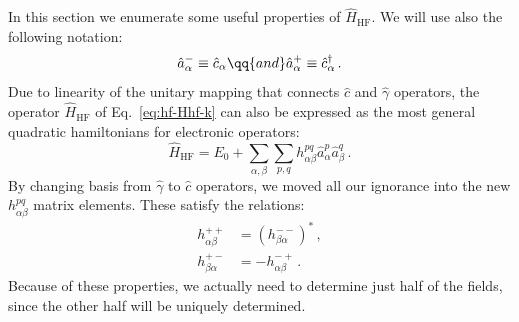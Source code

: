 In this section we enumerate some useful properties of $\hat H_\mathrm{HF}$. We will use also the following notation:
\[
	\hat a_\alpha^- \equiv \hat c_\alpha
	\qq{and}
	\hat a_\alpha^+ \equiv \hat c_\alpha^\dagger \, .
\]
Due to linearity of the unitary mapping that connects $\hat c$ and $\hat \gamma$ operators, the operator $\hat H_\mathrm{HF}$ of Eq.~\eqref{eq:hf-Hhf-k} can also be expressed as the most general quadratic hamiltonians for electronic operators:
\begin{equation}\label{eq:hf-Hhf-h}
	\hat H_\mathrm{HF} = E_0 + \sum_{\alpha,\beta} \sum_{p,q} h_{\alpha\beta}^{pq} \hat a_\alpha^p \hat a_\beta^q \, .
\end{equation}
By changing basis from $\hat \gamma$ to $\hat c$ operators, we moved all our ignorance into the new $h_{\alpha\beta}^{pq}$ matrix elements. These satisfy the relations:
\begin{align}
	h_{\alpha\beta}^{++} &= \left(h_{\beta\alpha}^{--}\right)^* \label{eq:hf-offdiag-relation} \, ,\\
	h_{\beta\alpha}^{+-} &= - h_{\alpha\beta}^{-+} \label{eq:hf-ondiag-relation} \, .
\end{align}
Because of these properties, we actually need to determine just half of the fields, since the other half will be uniquely determined.

